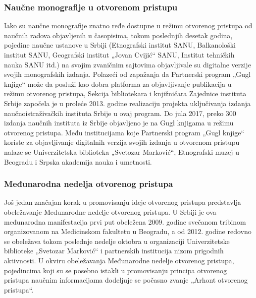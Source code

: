 \documentclass{article}
\begin{document}
\subsubsection{Naučne monografije u otvorenom pristupu}

Iako su naučne monografije znatno ređe dostupne u režimu otvorenog pristupa od naučnih radova objavljenih u časopisima, tokom poslednjih desetak godina, pojedine naučne ustanove u Srbiji (Etnografski institut SANU, Balkanološki institut SANU, Geografski institut „Jovan Cvijić“ SANU, Institut tehničkih nauka SANU itd.) na svojim zvaničnim sajtovima objavljivale su digitalne verzije svojih monografskih izdanja. Polazeći od zapažanja da Partnerski program „Gugl knjige“ može da posluži kao dobra platforma za objavljivanje publikacija u režimu otvorenog pristupa, Sekcija bibliotekara i knjižničara Zajednice instituta Srbije započela je u proleće 2013. godine realizaciju projekta uključivanja izdanja naučnoistraživačkih instituta Srbije u ovaj program. Do jula 2017, preko 300 izdanja naučnih instituta iz Srbije objavljeno je na Gugl knjigama u režimu otvorenog pristupa. Među institucijama koje Partnerski program „Gugl knjige“ koriste za objavljivanje digitalnih verzija svojih izdanja u otvorenom pristupu nalaze se Univerzitetska biblioteka „Svetozar Marković“, Etnografski muzej u Beogradu i Srpska akademija nauka i umetnosti.

\subsubsection{Međunarodna nedelja otvorenog pristupa}

Još jedan značajan korak u promovisanju ideje otvorenog pristupa predstavlja obeležavanje Međunarodne nedelje otvorenog pristupa. U Srbiji je ova međunarodna manifestacija prvi put obeležena 2009. godine svečanom tribinom organizovanom na Medicinskom fakultetu u Beogradu, a od 2012. godine redovno se obeležava tokom poslednje nedelje oktobra u organizaciji Univerzitetske biblioteke „Svetozar Marković“ i partnerskih institucija nizom prigodnih aktivnosti. U okviru obeležavanja Međunarodne nedelje otvorenog pristupa, pojedincima koji su se posebno istakli u promovisanju principa otvorenog pristupa naučnim informacijama dodeljuje se počasno zvanje „Arhont otvorenog pristupa“.

\end{document}
